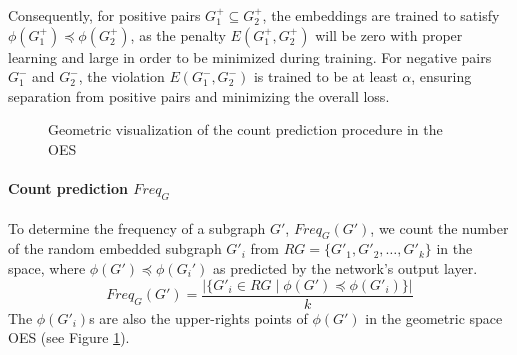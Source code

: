 \documentclass[pdflatex,sn-mathphys-num]{sn-jnl}%
\theoremstyle{thmstyleone}%
\theoremstyle{thmstyletwo}%
\theoremstyle{thmstylethree}%
\begin{document}
Consequently, for positive pairs \( G^+_1 \subseteq G^+_2 \), the embeddings are trained to satisfy \( \phi(G^+_1) \preceq \phi(G^+_2) \), as the penalty \( E(G^+_1, G^+_2) \) will be zero with proper learning and large in order to be minimized during training. For negative pairs \( G^-_1 \) and \( G^-_2 \), the violation \( E(G^-_1, G^-_2) \) is trained to be at least \( \alpha \), ensuring separation from positive pairs and minimizing the overall loss.

\begin{figure}
    \centering
    \vspace{-3pt}
    \resizebox{\linewidth}{!}{}
    \caption{\footnotesize Geometric visualization of the count prediction procedure in the OES}
    \label{fig:count_pred}
\end{figure}

\paragraph{Count prediction $Freq_G$}
To determine the frequency of a subgraph \( G' \), $Freq_G(G')$, we count the number of the random embedded subgraph \( G'_i \) from $RG=\{G'_1, G'_2, \dots, G'_k\}$ in the space, where \( \phi(G') \preceq \phi(G_i') \) as predicted by the network's output layer.
\textbf{\[Freq_G(G')=\frac{|\{G'_i \in RG \mid \phi(G') \preceq \phi(G'_i)\}|}{k}\]}
The $\phi(G'_i)$s are also the upper-rights points of $\phi(G')$ in the geometric space OES (see Figure \ref{fig:count_pred}).
\end{document}
